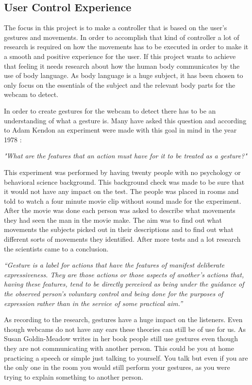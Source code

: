 \subsection{User Control Experience}
The focus in this project is to make a controller that is based on the user’s gestures and movements. In order to accomplish that kind of controller a lot of research is required on how the movements has to be executed in order to make it a smooth and positive experience for the user. If this project wants to achieve that feeling it needs research about how the human body communicates by the use of body language. As body language is a huge subject, it has been chosen to only focus on the essentials of the subject and the relevant body parts for the webcam to detect.

In order to create gestures for the webcam to detect there has to be an understanding of what a gesture is. Many have asked this question and according to Adam Kendon an experiment were made with this goal in mind in the year 1978 \parencite{Kendon2004}:
\bigskip

\emph{"What are the features that an action must have for it to be treated as a gesture?"} \parencite{Kendon2004}
\bigskip

This experiment was performed by having twenty people with no psychology or behavioral science background. This background check was made to be sure that it would not have any impact on the test. The people was placed in rooms and told to watch a four minute movie clip without sound made for the experiment. After the movie was done each person was asked to describe what movements they had seen the man in the movie make. The aim was to find out what movements the subjects picked out in their descriptions and to find out what different sorts of movements they identified. After more tests and a lot research the scientists came to a conclusion.
\bigskip

\emph{“Gesture is a label for actions that have the features of manifest deliberate expressiveness. They are those actions or those aspects of another’s actions that, having these features, tend to be directly perceived as being under the guidance of the observed person’s voluntary control and being done for the purposes of expression rather than in the service of some practical aim.”} \parencite{Kendon2004}
\bigskip

As recording to the research, gestures have a huge impact on the listeners. Even though webcams do not have any ears these theories can still be of use for us. As Susan Goldin-Meadow writes in her book \parencite{Meadow2005} people still use gestures even though they are not communicating with another person. This could be you at home practicing a speech or simple just talking to yourself. You talk but even if you are the only one in the room you would still perform your gestures, as you were trying to explain something to another person.

